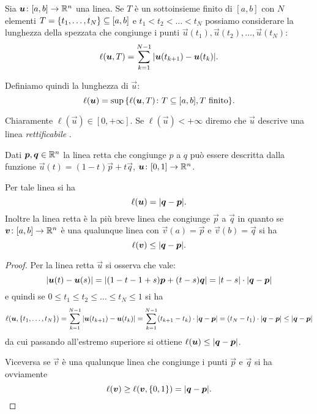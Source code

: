 \begin{definition}
Sia $\boldsymbol u\colon[a,b]\to {\mathbb R}^n$ una linea.
Se $T$ è un sottoinsieme finito di $[a,b]$ con $N$ elementi 
$T={\left\{ t_1, \dots, t_N \right\}}\subseteq [a,b]$ e $t_1< t_2 < \dots < t_N$
possiamo considerare la lunghezza della spezzata che congiunge 
i punti $\vec u(t_1), \vec u(t_2), \dots, \vec u(t_N)$:
\[
\ell(\boldsymbol u, T) = \sum_{k=1}^{N-1} {\left|\boldsymbol u(t_{k+1})-\boldsymbol u(t_k)\right|}.  
\]

Definiamo quindi la lunghezza di $\vec u$:
\[
\ell(\boldsymbol u) = \sup{\left\{ \ell(\boldsymbol u,T)\colon T\subseteq[a,b], \text{$T$ finito} \right\}}.  
\]

Chiaramente $\ell(\vec u) \in [0,+\infty]$.
Se $\ell(\vec u)<+\infty$ diremo che $\vec u$ descrive una linea 
\emph{rettificabile}%
.
\end{definition}

\begin{theorem}
Dati $\boldsymbol p, \boldsymbol q\in {\mathbb R}^n$ la linea retta che congiunge 
$p$ a $q$ può essere descritta dalla funzione 
$\vec u(t) = (1-t) \vec p + t \vec q$, $\boldsymbol u\colon[0,1]\to {\mathbb R}^n$.

Per tale linea si ha 
\[
 \ell(\boldsymbol u) = {\left|\boldsymbol q- \boldsymbol p\right|}.
\]
Inoltre la linea retta è la più breve linea che congiunge $\vec p$ a $\vec q$ 
in quanto se $\boldsymbol v\colon[a,b]\to {\mathbb R}^n$ è una qualunque linea con 
$\vec v(a)=\vec p$ e $\vec v(b)=\vec q$ si ha 
\[
\ell(\boldsymbol v) \le {\left|\boldsymbol q-\boldsymbol p\right|}.  
\]
\end{theorem}
%
\begin{proof}
Per la linea retta $\vec u$ si osserva che vale:
\[
  {\left|\boldsymbol u(t)-\boldsymbol u(s)\right|} 
  = {\left|(1-t - 1+s)\boldsymbol p + (t-s)\boldsymbol q\right|}
  = {\left|t-s\right|}\cdot {\left|\boldsymbol q - \boldsymbol p\right|}
\]
e quindi se $0\le t_1\le t_2\le \dots \le t_N \le 1$ si ha
\[
  \ell(\boldsymbol u, {\left\{ t_1,\dots,t_N \right\}}) = 
  \sum_{k=1}^{N-1} {\left|\boldsymbol u(t_{k+1}) - \boldsymbol u(t_k)\right|}
  = \sum_{k=1}^{N-1} (t_{k+1}-t_k)\cdot {\left|\boldsymbol q-\boldsymbol p\right|}
  = (t_N-t_1)\cdot {\left|\boldsymbol q-\boldsymbol p\right|}
  \le {\left|\boldsymbol q-\boldsymbol p\right|}
\]
da cui passando all'estremo superiore si ottiene 
$\ell(\boldsymbol u)\le {\left|\boldsymbol q -\boldsymbol p\right|}$. 

Viceversa se $\vec v$ è una qualunque linea che congiunge 
i punti $\vec p$ e $\vec q$ si ha ovviamente 
\[
  \ell(\boldsymbol v) \ge \ell(\boldsymbol v,{\left\{ 0,1 \right\}}) = {\left|\boldsymbol q - \boldsymbol p\right|}.
\]
\end{proof}

